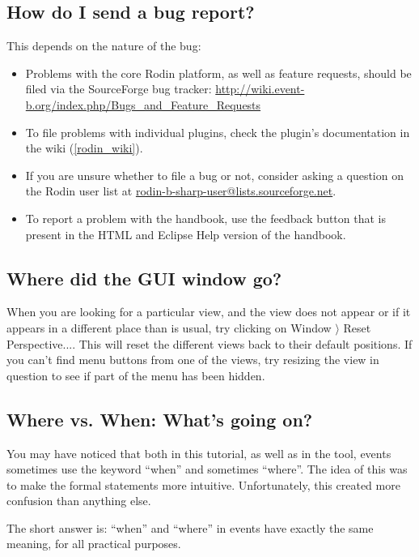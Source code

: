 \subsection{How do I send a bug report?}
\label{bug_report}

This depends on the nature of the bug:
\begin{itemize}
	\item Problems with the core Rodin platform, as well as feature requests, should be filed via the SourceForge bug tracker: \url{http://wiki.event-b.org/index.php/Bugs_and_Feature_Requests}
	\item To file problems with individual plugins, check the plugin's documentation in the wiki (\ref{rodin_wiki}).
	\item If you are unsure whether to file a bug or not, consider asking a question on the Rodin user list at \href{mailto:rodin-b-sharp-user@lists.sourceforge.net}{rodin-b-sharp-user@lists.sourceforge.net}.
	\item To report a problem with the handbook, use the feedback button that is present in the HTML and Eclipse Help version of the handbook.
\end{itemize}

\subsection{Where did the GUI window go?}

When you are looking for a particular view, and the view does not appear or if it appears in a different place than is usual, try clicking on \textsf{Window $\rangle $ Reset Perspective...}. This will reset the different views back to their default positions. If you can't find menu buttons from one of the views, try resizing the view in question to see if part of the menu has been hidden.

\subsection{Where vs. When: What's going on?}

You may have noticed that both in this tutorial, as well as in the tool, events sometimes use the keyword ``when'' and sometimes ``where''.  The idea of this was to make the formal statements more intuitive.  Unfortunately, this created more confusion than anything else.

The short answer is: ``when'' and ``where'' in events have exactly the same meaning, for all practical purposes.

